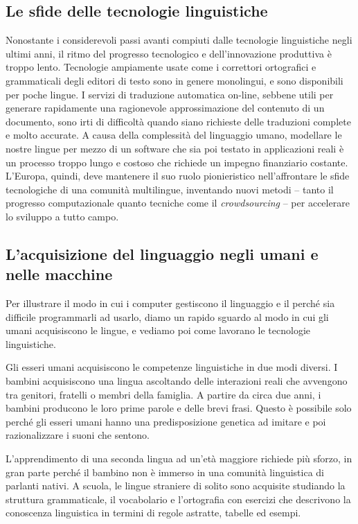 \begin{multicols}{2}
\subsection{Le sfide delle tecnologie linguistiche}

Nonostante i considerevoli passi avanti compiuti dalle tecnologie linguistiche
negli ultimi anni, il ritmo del progresso tecnologico e dell'innovazione
produttiva \`{e} troppo lento. Tecnologie ampiamente usate come i correttori
ortografici e grammaticali degli editori di testo sono in genere monolingui, e
sono disponibili per poche lingue. I servizi di traduzione automatica on-line,
sebbene utili per  generare rapidamente una ragionevole approssimazione del
contenuto di un documento, sono irti di difficolt\`{a} quando siano richieste
delle traduzioni complete e molto accurate. A causa della complessit\`{a} del
linguaggio umano, modellare le nostre lingue per mezzo di un software che sia
poi testato in applicazioni reali \`{e} un processo troppo lungo e costoso che
richiede un impegno finanziario costante. L'Europa, quindi, deve mantenere il
suo ruolo pionieristico nell'affrontare le sfide tecnologiche di una
comunit\`{a} multilingue, inventando nuovi metodi -- tanto il progresso
computazionale quanto tecniche come il \emph{crowdsourcing} -- per
accelerare lo sviluppo a tutto campo.


\subsection{L'acquisizione del linguaggio negli umani e nelle macchine}

Per illustrare il modo in cui i computer gestiscono il linguaggio e il perch\'{e}
sia difficile programmarli ad usarlo, diamo un rapido sguardo al modo in cui
gli umani acquisiscono le lingue, e vediamo poi come lavorano le tecnologie
linguistiche.

Gli esseri umani acquisiscono le competenze linguistiche in due modi
diversi. I bambini acquisiscono una lingua ascoltando delle interazioni reali
che avvengono tra genitori, fratelli o membri della famiglia. A partire da
circa due anni, i bambini producono le loro prime parole e delle brevi
frasi. Questo \`{e} possibile solo perch\'{e} gli esseri umani hanno una
predisposizione genetica ad imitare e poi razionalizzare i suoni che sentono.

L'apprendimento di una seconda lingua ad un'et\`{a} maggiore richiede pi\`{u}
sforzo, in gran parte perch\'{e} il bambino non \`{e} immerso in una
comunit\`{a} linguistica di parlanti nativi. A scuola, le lingue straniere di
solito sono acquisite studiando la struttura grammaticale, il vocabolario e
l'ortografia con esercizi che descrivono la conoscenza linguistica in termini
di regole astratte, tabelle ed esempi.


\end{multicols}
